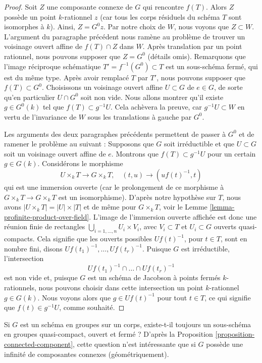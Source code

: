 \begin{proof}
\medskip\noindent
Soit $Z$ une composante connexe de $G$ qui rencontre $f(T)$. Alors $Z$
possède un point $k$-rationnel $z$ (car tous les corps résiduels du schéma $T$
sont isomorphes à $k$). Ainsi, $Z = G^0 z$. Par notre choix de $W$, nous voyons
que $Z \subset W$. L'argument du paragraphe précédent nous ramène
au problème de trouver un voisinage ouvert affine de $f(T) \cap Z$ dans $W$.
Après translation par un point rationnel, nous pouvons supposer que $Z = G^0$
(détails omis). Remarquons que l'image réciproque schématique
$T' = f^{-1}(G^0) \subset T$ est un sous-schéma fermé, qui est du même type.
Après avoir remplacé $T$ par $T'$, nous pouvons supposer que $f(T) \subset G^0$.
Choisissons un voisinage ouvert affine $U \subset G$
de $e \in G$, de sorte qu'en particulier $U \cap G^0$ soit non vide. Nous allons montrer
qu'il existe $g \in G^0(k)$ tel que $f(T) \subset g^{-1}U$.
Cela achèvera la preuve, car $g^{-1}U \subset W$ en vertu de l'invariance de $W$
sous les translations à gauche par $G^0$.

\medskip\noindent
Les arguments des deux paragraphes précédents permettent de passer à $G^0$
et de ramener le problème au suivant :
Supposons que $G$ soit irréductible et que $U \subset G$ soit un
voisinage ouvert affine de $e$. Montrons que $f(T) \subset g^{-1}U$
pour un certain $g \in G(k)$. Considérons le morphisme
$$
U \times_k T \longrightarrow G \times_k T,\quad
(t, u) \longrightarrow (uf(t)^{-1}, t)
$$
qui est une immersion ouverte (car le prolongement de ce morphisme à
$G \times_k T \to G \times_k T$ est un isomorphisme).
D'après notre hypothèse sur $T$, nous avons $|U \times_k T| = |U| \times |T|$
et de même pour $G \times_k T$, voir
le Lemme \ref{lemma-profinite-product-over-field}.
L'image de l'immersion ouverte affichée est donc une réunion finie
de rectangles $\bigcup_{i = 1, \ldots, n} U_i \times V_i$, avec
$V_i \subset T$ et $U_i \subset G$ ouverts quasi-compacts. Cela signifie que
les ouverts possibles $Uf(t)^{-1}$, pour $t \in T$, sont en nombre fini, disons
$Uf(t_1)^{-1}, \ldots, Uf(t_r)^{-1}$. Puisque $G$ est irréductible,
l'intersection
$$
Uf(t_1)^{-1} \cap \ldots \cap Uf(t_r)^{-1}
$$
est non vide et, puisque $G$ est un schéma de Jacobson à points fermés $k$-rationnels,
nous pouvons choisir dans cette intersection un point $k$-rationnel $g \in G(k)$.
Nous voyons alors que $g \in Uf(t)^{-1}$ pour tout $t \in T$, ce qui
signifie que $f(t) \in g^{-1}U$, comme souhaité.
\end{proof}

\begin{remark}
\label{remark-easy}
Si $G$ est un schéma en groupes sur un corps, existe-t-il toujours un sous-schéma en groupes quasi-compact,
ouvert et fermé ? D'après la
Proposition \ref{proposition-connected-component},
cette question n'est intéressante que si $G$ possède une infinité de composantes connexes
(géométriquement).
\end{remark}

